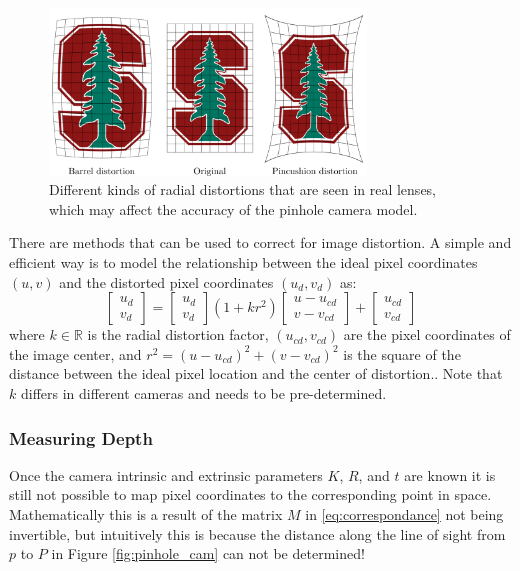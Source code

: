 \begin{figure}[ht]
\includegraphics[width=0.75\textwidth]{tex/figs/ch08_figs/lensdistortion.png}
\centering
\caption{Different kinds of radial distortions that are seen in real lenses, which may affect the accuracy of the pinhole camera model.}
\label{fig:distortion}
\end{figure}

There are methods that can be used to correct for image distortion. A simple and efficient way is to model the relationship between the ideal pixel coordinates $(u,v)$ and the distorted pixel coordinates $(u_d,v_d)$ as:
\begin{equation}
\begin{bmatrix}
    u_d \\
    v_d
\end{bmatrix}
=
\begin{bmatrix}
    u_d \\
    v_d
\end{bmatrix}
(1+kr^2)
\begin{bmatrix}
    u-u_{cd} \\
    v-v_{cd}
\end{bmatrix}
+
\begin{bmatrix}
    u_{cd} \\
    v_{cd}
\end{bmatrix}
\end{equation}
where $k \in \mathbb{R}$ is the radial distortion factor, $(u_{cd}, v_{cd})$ are the pixel coordinates of the image center, and $r^2=(u-u_{cd})^2+(v-v_{cd})^2$ is the square of the distance between the ideal pixel location and the center of distortion.. Note that $k$ differs in different cameras and needs to be pre-determined.

\subsubsection{Measuring Depth}
Once the camera intrinsic and extrinsic parameters $K$, $R$, and $t$ are known it is still not possible to map pixel coordinates to the corresponding point in space. Mathematically this is a result of the matrix $M$ in \eqref{eq:correspondance} not being invertible, but intuitively this is because the distance along the line of sight from $p$ to $P$ in Figure \ref{fig:pinhole_cam} can not be determined!

